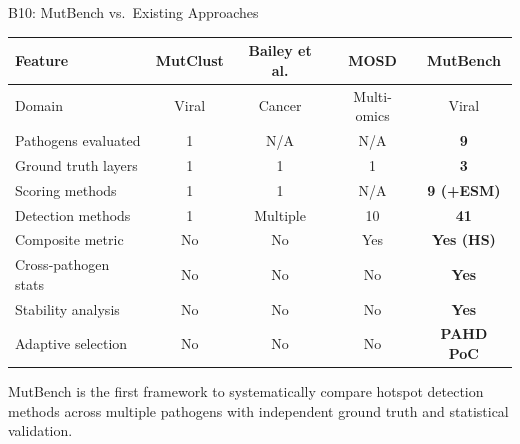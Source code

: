 \documentclass[aspectratio=169,11pt]{beamer}
\begin{document}
\begin{frame}{B10: MutBench vs.\ Existing Approaches}

\begin{center}
\footnotesize
\begin{tabular}{lcccc}
\toprule
\textbf{Feature} & \textbf{MutClust} & \textbf{Bailey et al.} & \textbf{MOSD} & \textbf{MutBench} \\
\midrule
Domain & Viral & Cancer & Multi-omics & Viral \\
Pathogens evaluated & 1 & N/A & N/A & \textbf{9} \\
Ground truth layers & 1 & 1 & 1 & \textbf{3} \\
Scoring methods & 1 & 1 & N/A & \textbf{9 (+ESM)} \\
Detection methods & 1 & Multiple & 10 & \textbf{41} \\
Composite metric & No & No & Yes & \textbf{Yes (HS)} \\
Cross-pathogen stats & No & No & No & \textbf{Yes} \\
Stability analysis & No & No & No & \textbf{Yes} \\
Adaptive selection & No & No & No & \textbf{PAHD PoC} \\
\bottomrule
\end{tabular}
\end{center}

\vspace{0.5em}
MutBench is the first framework to systematically compare hotspot detection methods across multiple pathogens with independent ground truth and statistical validation.
\end{frame}

\addtocounter{framenumberappendix}{-\value{framenumber}}
\addtocounter{framenumber}{\value{framenumberappendix}}
\end{document}

